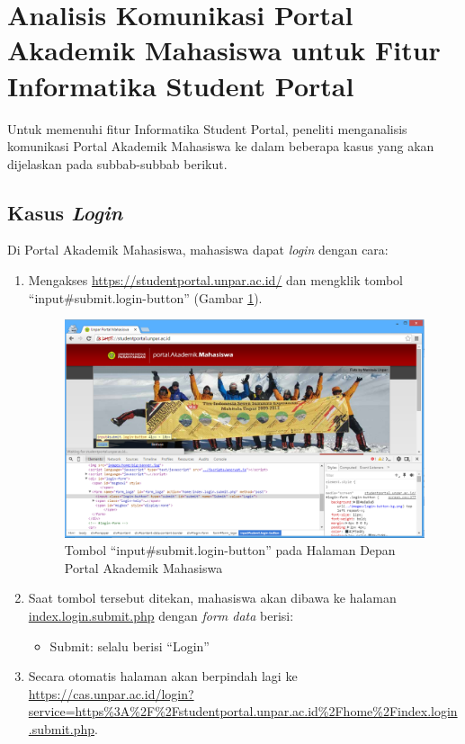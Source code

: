 \section{Analisis Komunikasi Portal Akademik Mahasiswa untuk Fitur Informatika Student Portal}
Untuk memenuhi fitur Informatika Student Portal, peneliti menganalisis komunikasi Portal Akademik Mahasiswa ke dalam beberapa kasus yang akan dijelaskan pada subbab-subbab berikut.

\subsection{Kasus \textit{Login}}
Di Portal Akademik Mahasiswa, mahasiswa dapat \textit{login} dengan cara:
\begin{enumerate}
	\item Mengakses \url{https://studentportal.unpar.ac.id/} dan mengklik tombol ``input\#submit.login-button'' (Gambar \ref{fig:3_case_login}).
	\begin{figure}[H]
			\centering
			\includegraphics[scale=0.5]{Gambar/case-login}
			\caption{Tombol ``input\#submit.login-button'' pada Halaman Depan Portal Akademik Mahasiswa} 
			\label{fig:3_case_login}
		\end{figure}
		
	\item Saat tombol tersebut ditekan, mahasiswa akan dibawa ke halaman \url{index.login.submit.php} dengan \textit{form data} berisi:
			\begin{itemize}
				\item Submit: selalu berisi ``Login''
			\end{itemize}
		
	\item Secara otomatis halaman akan berpindah lagi ke \url{https://cas.unpar.ac.id/login? service=https\%3A\%2F\%2Fstudentportal.unpar.ac.id\%2Fhome\%2Findex.login.submit.php}.
		

\end{enumerate}
